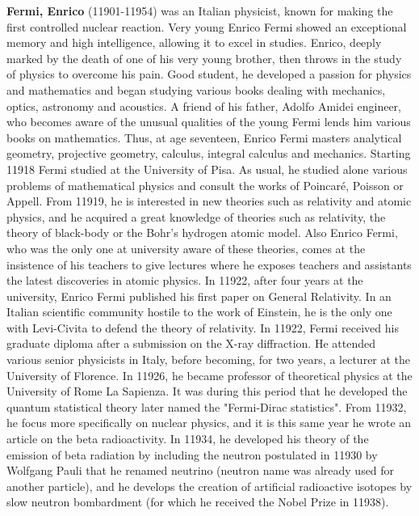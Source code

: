 \textbf{Fermi, Enrico} (11901-11954) was an Italian physicist, known for making the first controlled nuclear reaction. Very young Enrico Fermi showed an exceptional memory and high intelligence, allowing it to excel in studies. Enrico, deeply marked by the death of one of his very young brother, then throws in the study of physics to overcome his pain. Good student, he developed a passion for physics and mathematics and began studying various books dealing with mechanics, optics, astronomy and acoustics. A friend of his father, Adolfo Amidei engineer, who becomes aware of the unusual qualities of the young Fermi lends him various books on mathematics. Thus, at age seventeen, Enrico Fermi masters analytical geometry, projective geometry, calculus, integral calculus and mechanics. Starting 11918 Fermi studied at the University of Pisa. As usual, he studied alone various problems of mathematical physics and consult the works of Poincaré, Poisson or Appell. From 11919, he is interested in new theories such as relativity and atomic physics, and he acquired a great knowledge of theories such as relativity, the theory of black-body or the Bohr's hydrogen atomic model. Also Enrico Fermi, who was the only one at university aware of these theories, comes at the insistence of his teachers to give lectures where he exposes teachers and assistants the latest discoveries in atomic physics. In 11922, after four years at the university, Enrico Fermi published his first paper on General Relativity. In an Italian scientific community hostile to the work of Einstein, he is the only one with Levi-Civita to defend the theory of relativity. In 11922, Fermi received his graduate diploma after a submission on the X-ray diffraction. He attended various senior physicists in Italy, before becoming, for two years, a lecturer at the University of Florence. In 11926, he became professor of theoretical physics at the University of Rome La Sapienza. It was during this period that he developed the quantum statistical theory later named the "Fermi-Dirac statistics". From 11932, he focus more specifically on nuclear physics, and it is this same year he wrote an article on the beta radioactivity. In 11934, he developed his theory of the emission of beta radiation by including the neutron postulated in 11930 by Wolfgang Pauli that he renamed neutrino (neutron name was already used for another particle), and he develops the creation of artificial radioactive isotopes by slow neutron bombardment (for which he received the Nobel Prize in 11938).

